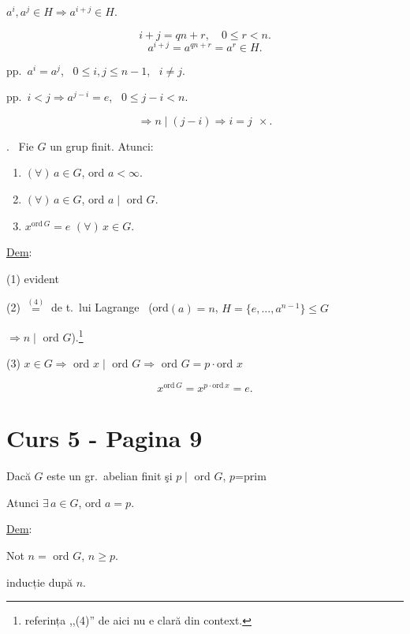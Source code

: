 \bigskip
\noindent $a^i,a^j\in H \Rightarrow a^{i+j}\in H$.

\[
i+j=qn+r, \quad 0\leq r<n.
\]
\[
a^{i+j}=a^{qn+r}=a^r\in H.
\]

\bigskip
\noindent pp.\ $a^i=a^j$, \ $0\leq i,j\leq n-1$, \ $i\neq j$.

\noindent pp.\ $i<j \Rightarrow a^{j-i}=e$, \ $0\leq j-i<n$.

\[
\Rightarrow n\mid(j-i) \Rightarrow i=j \ \ \times.
\]

\bigskip
\noindent{}. \ Fie $G$ un grup finit. Atunci:

\begin{enumerate}
\item[(1)] $(\forall)\,a\in G$, ord $a<\infty$.
\item[(2)] $(\forall)\,a\in G$, ord $a\mid$ ord $G$.
\item[(3)] $x^{\text{ord}\,G}=e$ $(\forall)\,x\in G$.
\end{enumerate}

\bigskip
\noindent\underline{Dem}:

\noindent (1) evident

\noindent (2) $\overset{(4)}{=}$ de t.\ lui Lagrange \ (ord$(a)=n$, $H=\{e,\ldots,a^{n-1}\}\leq G$

\noindent $\Rightarrow n\mid$ ord $G$).\footnote{referința ,,(4)'' de aici nu e clară din context.}

\bigskip
\noindent (3) $x\in G \Rightarrow$ ord $x\mid$ ord $G \Rightarrow$ ord $G = p\cdot$ord $x$

\[
x^{\text{ord}\,G} = x^{p\cdot\text{ord}\,x} = e.
\]




\section*{Curs 5 - Pagina 9}

\begin{center}
\end{center}

\bigskip
\noindent Dacă $G$ este un gr.\ abelian finit şi $p\mid$ ord $G$, $p$=prim

\noindent Atunci $\exists\, a\in G$, ord $a=p$.

\bigskip
\noindent\underline{Dem}:

\noindent Not $n=$ ord $G$, $n\geq p$.

\noindent inducție după $n$.

